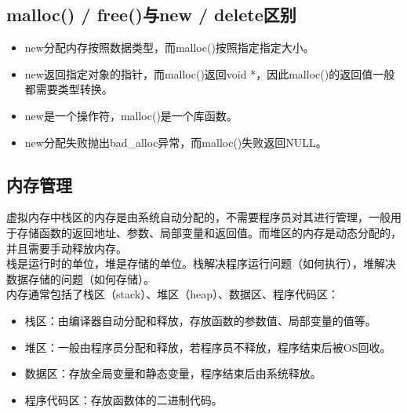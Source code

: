 \vspace{0.5cm}

\subsection{malloc() / free()与new / delete区别}

\begin{itemize}
	\item new分配内存按照数据类型，而malloc()按照指定指定大小。

	\item new返回指定对象的指针，而malloc()返回void *，因此malloc()的返回值一般都需要类型转换。

	\item new是一个操作符，malloc()是一个库函数。

	\item new分配失败抛出bad\_alloc异常，而malloc()失败返回NULL。
\end{itemize}

\vspace{0.5cm}

\subsection{内存管理}

虚拟内存中栈区的内存是由系统自动分配的，不需要程序员对其进行管理，一般用于存储函数的返回地址、参数、局部变量和返回值。而堆区的内存是动态分配的，并且需要手动释放内存。\\

栈是运行时的单位，堆是存储的单位。栈解决程序运行问题（如何执行），堆解决数据存储的问题（如何存储）。 \\

内存通常包括了栈区（stack）、堆区（heap）、数据区、程序代码区：

\begin{itemize}
	\item 栈区：由编译器自动分配和释放，存放函数的参数值、局部变量的值等。

	\item 堆区：一般由程序员分配和释放，若程序员不释放，程序结束后被OS回收。

	\item 数据区：存放全局变量和静态变量，程序结束后由系统释放。

	\item 程序代码区：存放函数体的二进制代码。
\end{itemize}

